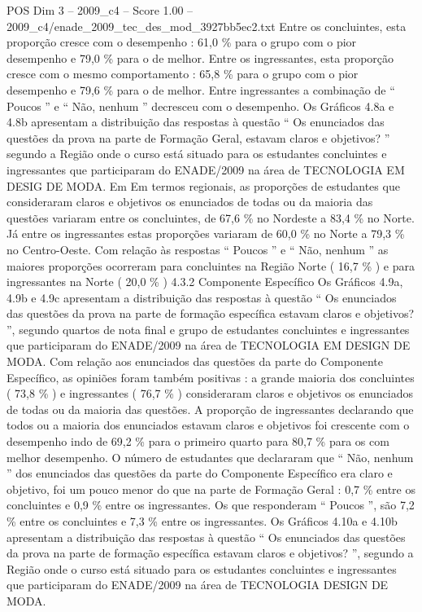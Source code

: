 \begin{textsample}{POS Dim 3 – 2009\_c4 – Score 1.00 – 2009\_c4/enade\_2009\_tec\_des\_mod\_3927bb5ec2.txt}
Entre os concluintes, esta proporção cresce com o desempenho : 61,0 \% para o grupo com o pior desempenho e 79,0 \% para o de melhor.
Entre os ingressantes, esta proporção cresce com o mesmo comportamento : 65,8 \% para o grupo com o pior desempenho e 79,6 \% para o de melhor.
Entre ingressantes a combinação de “ Poucos ” e “ Não, nenhum ” decresceu com o desempenho.
Os Gráficos 4.8a e 4.8b apresentam a distribuição das respostas à questão “ Os enunciados das questões da prova na parte de Formação Geral, estavam claros e objetivos? ” segundo a Região onde o curso está situado para os estudantes concluintes e ingressantes que participaram do ENADE/2009 na área de TECNOLOGIA EM DESIG DE MODA.
Em Em termos regionais, as proporções de estudantes que consideraram claros e objetivos os enunciados de todas ou da maioria das questões variaram entre os concluintes, de 67,6 \% no Nordeste a 83,4 \% no Norte.
Já entre os ingressantes estas proporções variaram de 60,0 \% no Norte a 79,3 \% no Centro-Oeste.
Com relação às respostas “ Poucos ” e “ Não, nenhum ” as maiores proporções ocorreram para concluintes na Região Norte ( 16,7 \% ) e para ingressantes na Norte ( 20,0 \% ) 4.3.2 Componente Específico Os Gráficos 4.9a, 4.9b e 4.9c apresentam a distribuição das respostas à questão “ Os enunciados das questões da prova na parte de formação específica estavam claros e objetivos? ”, segundo quartos de nota final e grupo de estudantes concluintes e ingressantes que participaram do ENADE/2009 na área de TECNOLOGIA EM DESIGN DE MODA.
Com relação aos enunciados das questões da parte do Componente Específico, as opiniões foram também positivas : a grande maioria dos concluintes ( 73,8 \% ) e ingressantes ( 76,7 \% ) consideraram claros e objetivos os enunciados de todas ou da maioria das questões.
A proporção de ingressantes declarando que todos ou a maioria dos enunciados estavam claros e objetivos foi crescente com o desempenho indo de 69,2 \% para o primeiro quarto para 80,7 \% para os com melhor desempenho.
O número de estudantes que declararam que “ Não, nenhum ” dos enunciados das questões da parte do Componente Específico era claro e objetivo, foi um pouco menor do que na parte de Formação Geral : 0,7 \% entre os concluintes e 0,9 \% entre os ingressantes.
Os que responderam “ Poucos ”, são 7,2 \% entre os concluintes e 7,3 \% entre os ingressantes.
Os Gráficos 4.10a e 4.10b apresentam a distribuição das respostas à questão “ Os enunciados das questões da prova na parte de formação específica estavam claros e objetivos? ”, segundo a Região onde o curso está situado para os estudantes concluintes e ingressantes que participaram do ENADE/2009 na área de TECNOLOGIA DESIGN DE MODA.

\end{textsample}
